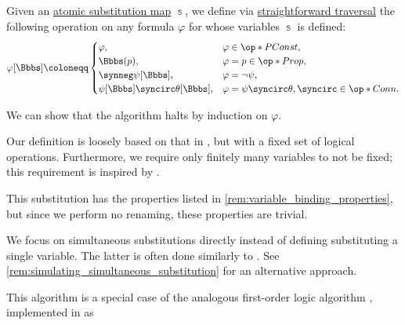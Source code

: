 \begin{algorithm}\label{alg:propositional_substitution}\mimprovised
  Given an \hyperref[def:atomic_propositional_substitution]{atomic substitution map} \( \Bbbs \), we define via \hyperref[rem:straightforward_traversal]{straightforward traversal} the following operation on any formula \( \varphi \) for whose variables \( \Bbbs \) is defined:
  \begin{equation*}
    \varphi[\Bbbs] \coloneqq \begin{cases}
      \varphi,                            &\varphi \in \op*{PConst}, \\
      \Bbbs(p),                           &\varphi = p \in \op*{Prop}, \\
      \synneg \psi[\Bbbs],                &\varphi = \neg \psi, \\
      \psi[\Bbbs] \syncirc \theta[\Bbbs], &\varphi = \psi \syncirc \theta, {\syncirc} \in \op*{Conn}. \\
    \end{cases}
  \end{equation*}
\end{algorithm}
\begin{defproof}
  We can show that the algorithm halts by induction on \( \varphi \).
\end{defproof}
\begin{comments}
  \item Our definition is loosely based on that in \cite[def. 3.1.3]{CitkinMuravitsky2022ConsequenceRelations}, but with a fixed set of logical operations. Furthermore, we require only finitely many variables to not be fixed; this requirement is inspired by \cite[222]{Mimram2020ProgramEqualsProof}.

  \item This substitution has the properties listed in \cref{rem:variable_binding_properties}, but since we perform no renaming, these properties are trivial.

  \item We focus on simultaneous substitutions directly instead of defining substituting a single variable. The latter is often done similarly to . See \cref{rem:simulating_simultaneous_substitution} for an alternative approach.

  \item This algorithm is a special case of the analogous first-order logic algorithm , implemented in \cite{notebook:code} as
  \begin{CodeRefDisplay}
  \end{CodeRefDisplay}
\end{comments}

